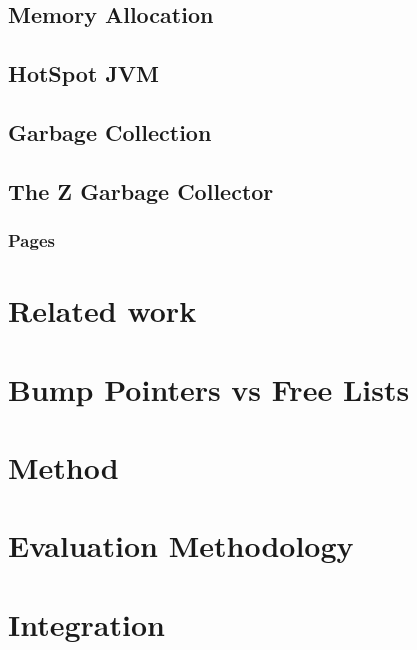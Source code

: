 \documentclass[a4paper,12pt]{article}
\begin{document}
\subsection{Memory Allocation}
\label{sec:memory_allocation}


\subsection{HotSpot JVM}
\label{sec:hotspot}


\subsection{Garbage Collection}
\label{sec:gc}


\newpage
\subsection{The Z Garbage Collector}
\label{sec:zgc}


\subsubsection{Pages}
\label{sec:zpage}


\section{Related work}


\section{Bump Pointers vs Free Lists}
\label{sec:theory}


\section{Method}
\label{sec:method}


\section{Evaluation Methodology}
\label{sec:evaluation}


\section{Integration}
\label{sec:integration}

\end{document}
